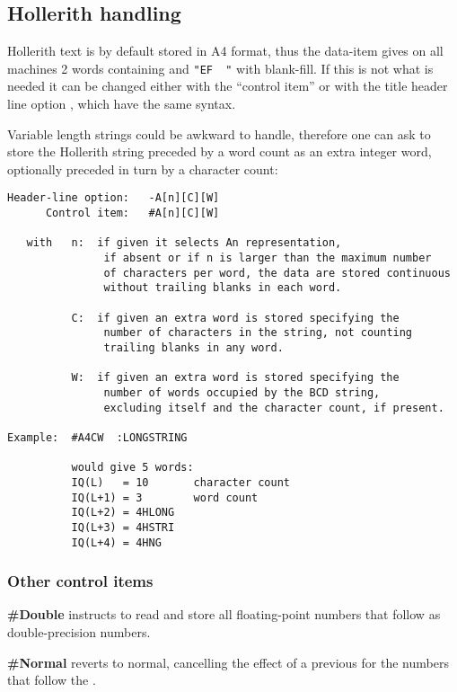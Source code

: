 \newpage
\subsection*{Hollerith handling}

Hollerith text is by default stored in A4 format,
thus the data-item  gives on all machines 2 words
containing  and \verb'"EF  "' with blank-fill.
If this is not what is needed it can be changed either with
the ``control item''  or with the title header line option ,
which have the same syntax.

Variable length strings could be awkward to handle,
therefore one can ask  to store the Hollerith string preceded
by a word count as an extra integer word,
optionally preceded in turn by a character count:
\begin{verbatim}
Header-line option:   -A[n][C][W]
      Control item:   #A[n][C][W]

   with   n:  if given it selects An representation,
               if absent or if n is larger than the maximum number
               of characters per word, the data are stored continuous
               without trailing blanks in each word.

          C:  if given an extra word is stored specifying the
               number of characters in the string, not counting
               trailing blanks in any word.

          W:  if given an extra word is stored specifying the
               number of words occupied by the BCD string,
               excluding itself and the character count, if present.

Example:  #A4CW  :LONGSTRING

          would give 5 words:
          IQ(L)   = 10       character count
          IQ(L+1) = 3        word count
          IQ(L+2) = 4HLONG
          IQ(L+3) = 4HSTRI
          IQ(L+4) = 4HNG
\end{verbatim} 
\newpage

\subsubsection{Other control items}

\textbf{\#Double } instructs  to read and store all floating-point
numbers that follow as double-precision numbers.

\textbf{\#Normal } reverts to normal, cancelling the effect
of a previous  for the numbers that follow the .

